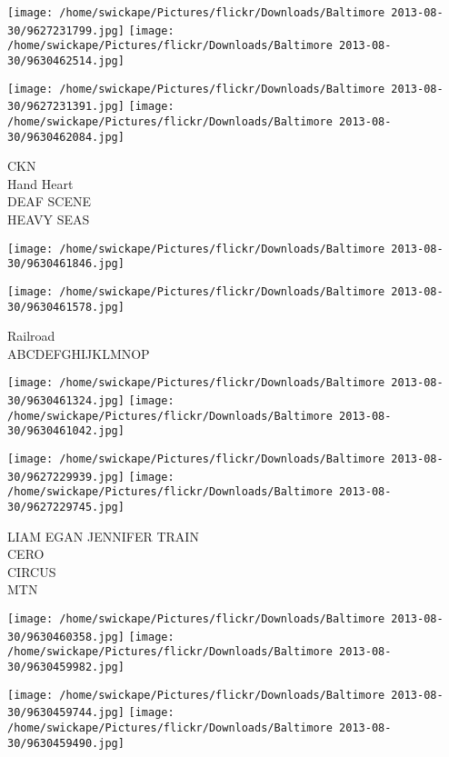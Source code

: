 \documentclass[10pt,letterpaper]{article}
\begin{document}
\texttt{[image: /home/swickape/Pictures/flickr/Downloads/Baltimore 2013-08-30/9627231799.jpg]}
\texttt{[image: /home/swickape/Pictures/flickr/Downloads/Baltimore 2013-08-30/9630462514.jpg]}

\texttt{[image: /home/swickape/Pictures/flickr/Downloads/Baltimore 2013-08-30/9627231391.jpg]}
\texttt{[image: /home/swickape/Pictures/flickr/Downloads/Baltimore 2013-08-30/9630462084.jpg]}

CKN\\
Hand Heart\\
DEAF SCENE\\
HEAVY SEAS\\
\pagebreak

\texttt{[image: /home/swickape/Pictures/flickr/Downloads/Baltimore 2013-08-30/9630461846.jpg]}

\vspace{0.25in}
\texttt{[image: /home/swickape/Pictures/flickr/Downloads/Baltimore 2013-08-30/9630461578.jpg]}

Railroad\\
ABCDEFGHIJKLMNOP\\
\pagebreak

\texttt{[image: /home/swickape/Pictures/flickr/Downloads/Baltimore 2013-08-30/9630461324.jpg]}
\texttt{[image: /home/swickape/Pictures/flickr/Downloads/Baltimore 2013-08-30/9630461042.jpg]}

\texttt{[image: /home/swickape/Pictures/flickr/Downloads/Baltimore 2013-08-30/9627229939.jpg]}
\texttt{[image: /home/swickape/Pictures/flickr/Downloads/Baltimore 2013-08-30/9627229745.jpg]}

LIAM EGAN JENNIFER TRAIN\\
CERO\\
CIRCUS\\
MTN\\
\pagebreak

\texttt{[image: /home/swickape/Pictures/flickr/Downloads/Baltimore 2013-08-30/9630460358.jpg]}
\texttt{[image: /home/swickape/Pictures/flickr/Downloads/Baltimore 2013-08-30/9630459982.jpg]}

\texttt{[image: /home/swickape/Pictures/flickr/Downloads/Baltimore 2013-08-30/9630459744.jpg]}
\texttt{[image: /home/swickape/Pictures/flickr/Downloads/Baltimore 2013-08-30/9630459490.jpg]}
\end{document}
